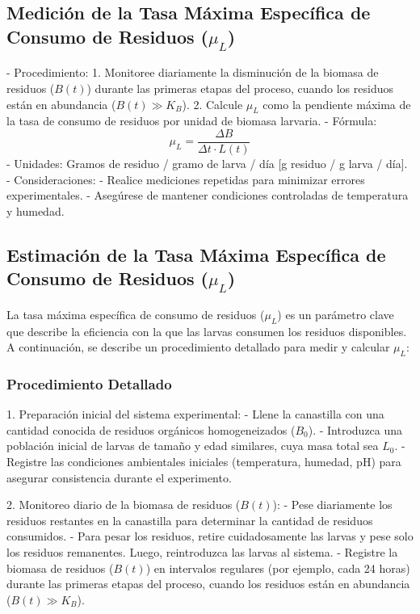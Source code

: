 \documentclass[12pt]{article}
\begin{document}
\subsection{Medición de la Tasa Máxima Específica de Consumo de Residuos ($\mu_L$)}
- Procedimiento:
  1. Monitoree diariamente la disminución de la biomasa de residuos ($B(t)$) durante las primeras etapas del proceso, cuando los residuos están en abundancia ($B(t) \gg K_B$).
  2. Calcule $\mu_L$ como la pendiente máxima de la tasa de consumo de residuos por unidad de biomasa larvaria.
- Fórmula:
  \[
  \mu_L = \frac{\Delta B}{\Delta t \cdot L(t)}
  \]
- Unidades: Gramos de residuo / gramo de larva / día [g residuo / g larva / día].
- Consideraciones:
  - Realice mediciones repetidas para minimizar errores experimentales.
  - Asegúrese de mantener condiciones controladas de temperatura y humedad.
\subsection{Estimación de la Tasa Máxima Específica de Consumo de Residuos ($\mu_L$)}

La tasa máxima específica de consumo de residuos ($\mu_L$) es un parámetro clave que describe la eficiencia con la que las larvas consumen los residuos disponibles. A continuación, se describe un procedimiento detallado para medir y calcular $\mu_L$:

\subsubsection{Procedimiento Detallado}

1. Preparación inicial del sistema experimental:
   - Llene la canastilla con una cantidad conocida de residuos orgánicos homogeneizados ($B_0$).
   - Introduzca una población inicial de larvas de tamaño y edad similares, cuya masa total sea $L_0$.
   - Registre las condiciones ambientales iniciales (temperatura, humedad, pH) para asegurar consistencia durante el experimento.

2. Monitoreo diario de la biomasa de residuos ($B(t)$):
   - Pese diariamente los residuos restantes en la canastilla para determinar la cantidad de residuos consumidos.
   - Para pesar los residuos, retire cuidadosamente las larvas y pese solo los residuos remanentes. Luego, reintroduzca las larvas al sistema.
   - Registre la biomasa de residuos ($B(t)$) en intervalos regulares (por ejemplo, cada 24 horas) durante las primeras etapas del proceso, cuando los residuos están en abundancia ($B(t) \gg K_B$).
\end{document}
